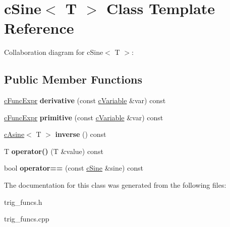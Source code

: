 \hypertarget{classcSine}{\section{c\-Sine$<$ T $>$ Class Template Reference}
\label{classcSine}
}


Collaboration diagram for c\-Sine$<$ T $>$\-:
\subsection*{Public Member Functions}
\begin{DoxyCompactItemize}
\item 
\hypertarget{classcSine_a5ec7b7f7e53f1df7218cbb672f45ef5e}{\hyperlink{classcFuncExpr}{c\-Func\-Expr} {\bfseries derivative} (const \hyperlink{classcVariable}{c\-Variable} \&var) const }\label{classcSine_a5ec7b7f7e53f1df7218cbb672f45ef5e}

\item 
\hypertarget{classcSine_a06fd4177da7162742d502789467c03a7}{\hyperlink{classcFuncExpr}{c\-Func\-Expr} {\bfseries primitive} (const \hyperlink{classcVariable}{c\-Variable} \&var) const }\label{classcSine_a06fd4177da7162742d502789467c03a7}

\item 
\hypertarget{classcSine_aee443b21d547991e212b19580a6726b9}{\hyperlink{classcAsine}{c\-Asine}$<$ T $>$ {\bfseries inverse} () const }\label{classcSine_aee443b21d547991e212b19580a6726b9}

\item 
\hypertarget{classcSine_a1888719b16cc44b40b961af454f41479}{T {\bfseries operator()} (T \&value) const }\label{classcSine_a1888719b16cc44b40b961af454f41479}

\item 
\hypertarget{classcSine_a72e1182bf1e07428cf29a7a9aea1946c}{bool {\bfseries operator==} (const \hyperlink{classcSine}{c\-Sine} \&sine) const }\label{classcSine_a72e1182bf1e07428cf29a7a9aea1946c}

\end{DoxyCompactItemize}


The documentation for this class was generated from the following files\-:\begin{DoxyCompactItemize}
\item 
trig\-\_\-funcs.\-h\item 
trig\-\_\-funcs.\-cpp\end{DoxyCompactItemize}
